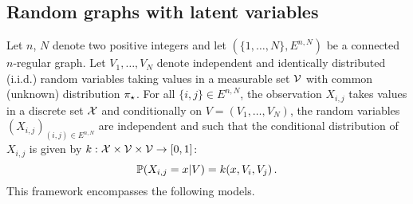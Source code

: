 \subsection{Random graphs with latent variables}
Let $n$, $N$ denote two positive integers and let $(\{1,\ldots,N\},E^{n,N})$ be a connected $n$-regular graph. 
Let $V_1,\ldots,V_N$ denote independent and identically distributed (i.i.d.) random variables taking values in a measurable set $\mathcal{V}$ with common (unknown) distribution $\pi_{\star}$.  For all $\{i,j\}\in E^{n,N}$, the observation $X_{i,j}$ takes values in a discrete set $\mathcal{X}$ and conditionally on $V=(V_1,\ldots,V_N)$, the random variables $(X_{i,j})_{(i,j)\in E^{n,N}}$ are independent and such that the conditional distribution of $X_{i,j}$ is given by $k: \mathcal{X}\times\mathcal{V}\times\mathcal{V}\to[0,1]$:
\begin{equation*}
\mathbb{P}(X_{i,j}=x|V)=k(x,V_i,V_j)\,.
\end{equation*}
This framework encompasses the following models.


